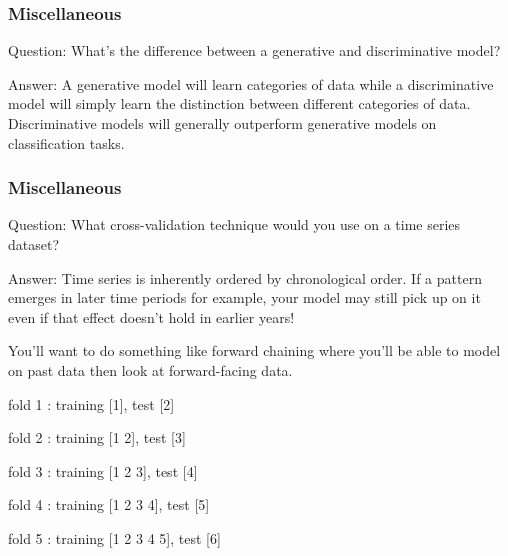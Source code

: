 \documentclass[11pt]{beamer}
\begin{document}
\begin{frame}
\frametitle{Miscellaneous}
\begin{block}{Question:}
	What’s the difference between a generative and discriminative model?
\end{block}
\begin{block}{Answer:}
	A generative model will learn categories of data while a discriminative model will simply learn the distinction between different categories of data. Discriminative models will generally outperform generative models on classification tasks.
\end{block}
\end{frame}

\begin{frame}
\frametitle{Miscellaneous}
\begin{block}{Question:}
	What cross-validation technique would you use on a time series dataset?
\end{block}
\begin{block}{Answer:}
	Time series is inherently ordered by chronological order. If a pattern emerges in later time periods for example, your model may still pick up on it even if that effect doesn’t hold in earlier years!
	
	You’ll want to do something like forward chaining where you’ll be able to model on past data then look at forward-facing data.
	
	fold 1 : training [1], test [2]
	
	fold 2 : training [1 2], test [3]
	
	fold 3 : training [1 2 3], test [4]
	
	fold 4 : training [1 2 3 4], test [5]
	
	fold 5 : training [1 2 3 4 5], test [6]
\end{block}
\end{frame}
\end{document}
